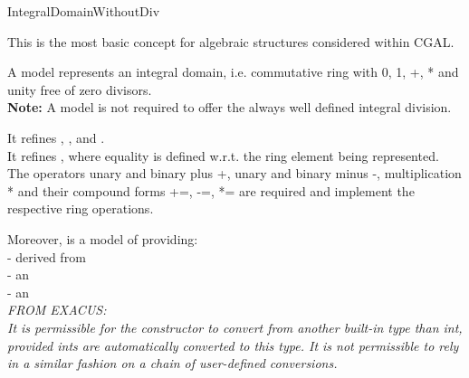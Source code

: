 \begin{ccRefConcept}{IntegralDomainWithoutDiv}


\ccDefinition

This is the most basic concept for algebraic structures considered within CGAL. 

A model   represents an integral domain,
i.e. commutative ring with 0, 1, +, * and unity free of zero divisors.\\ 
{\bf Note:} A model is not required to offer the always well defined integral division.

It refines , , 
and . \\ 
It refines , where equality is defined w.r.t. 
the ring element being represented. \\
The operators unary and binary plus +, unary and binary minus -, 
multiplication * and their compound forms +=, -=, *= are required and 
implement the respective ring operations.

Moreover,  is a model of 
 providing:\\ 
-  derived from  \\
-   an \\
-  an \\


{ \em \small FROM EXACUS: \\
It is permissible for the constructor 
to convert from another built-in type than int, provided ints are
automatically converted to this type. It is not permissible to 
rely in a similar fashion on a chain of user-defined conversions.
}



\ccRefines
{}\\
\\
\\
\\ 
\\


\end{ccRefConcept}
